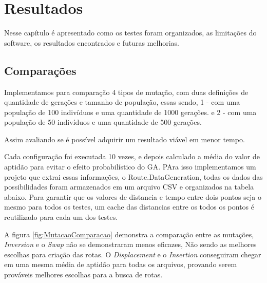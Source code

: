 \chapter{Resultados}
Nesse capítulo é apresentado como os testes foram organizados, as limitações do software, os resultados encontrados e futuras melhorias.


\section{Comparações}

Implementamos para comparação 4 tipos de mutação, com duas definições de quantidade de gerações e tamanho de população, essas sendo, 1 - com uma população de 100 indivíduos e uma quantidade de 1000 gerações. e 2 - com uma população de 50 indivíduos e uma quantidade de 500 gerações.
 
 Assim avaliando se é possível adquirir um resultado viável em menor tempo. 

Cada configuração foi executada 10 vezes, e depois calculado a média do valor de aptidão para evitar o efeito probabilístico do GA. PAra isso implementamos um projeto que extrai essas informações, o Route.DataGeneration, todas os dados das possibilidades foram armazenados em um arquivo CSV e organizados na tabela abaixo. 
Para garantir que os valores de distancia e tempo entre dois pontos seja o mesmo para todos os testes, um cache das distancias entre os todos os pontos é reutilizado para cada um dos testes.

\begin{center}
	\label{fig:MutacaoComparacao}
\end{center}

A figura \ref{fig:MutacaoComparacao} demonstra a comparação entre as mutações, \textit{Inversion} e o \textit{Swap} não se demonstraram menos eficazes, Não sendo as melhores escolhas para criação das rotas. O \textit{Displacement} e o \textit{Insertion} conseguiram chegar em uma mesma média de aptidão para todas os arquivos, provando serem prováveis melhores escolhas para a busca de rotas.


